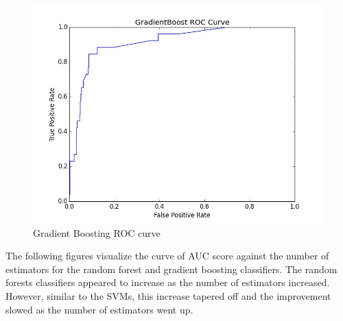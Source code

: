 \documentclass{article} %
\begin{document}
\begin{figure}[h]
\centering
{\caption{Gradient Boosting ROC curve} \includegraphics[scale=0.4]{img/grad_roc.jpg}}
\end{figure}

The following figures visualize the curve of AUC score against the number of
estimators for the random forest and gradient boosting classifiers. The random
forests classifiers appeared to increase as the number of estimators increased.
However, similar to the SVMs, this increase tapered off and the improvement
slowed as the number of estimators went up.

\begin{figure}[h]
    \centering
    \qquad
\end{figure}
\end{document}

